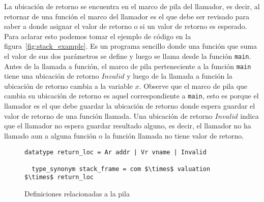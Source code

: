 La ubicación de retorno se encuentra en el marco de pila del llamador, es decir, al retornar de una función el marco del llamador es el que debe ser revisado para saber a donde asignar el valor de retorno o si un valor de retorno es esperado.
Para aclarar esto podemos tomar el ejemplo de código en la figura~\ref{fig:stack_example}.
Es un programa sencillo donde una función que suma el valor de sus dos parámetros se define y luego se llama desde la función \verb|main|.
Antes de la llamada a función, el marco de pila perteneciente a la función \verb|main| tiene una ubicación de retorno $Invalid$ y luego de la llamada a función la ubicación de retorno cambia a la variable $x$.
Observe que el marco de pila que cambia su ubicación de retorno es aquel correspondiente a \verb|main|, esto es porque el llamador es el que debe guardar la ubicación de retorno donde espera guardar el valor de retorno de una función llamada.
Una ubicación de retorno $Invalid$ indica que el llamador no espera guardar resultado alguno, es decir, el llamador no ha llamado aun a alguna función o la función llamada no tiene valor de retorno.

\begin{figure}
  \begin{lstlisting}[frame=single, mathescape=true]
  datatype return_loc = Ar addr | Vr vname | Invalid

  type_synonym stack_frame = com $\times$ valuation $\times$ return_loc
  \end{lstlisting}

  \caption{Definiciones relacionadas a la pila}
  \label{fig:stack_def}
\end{figure}

